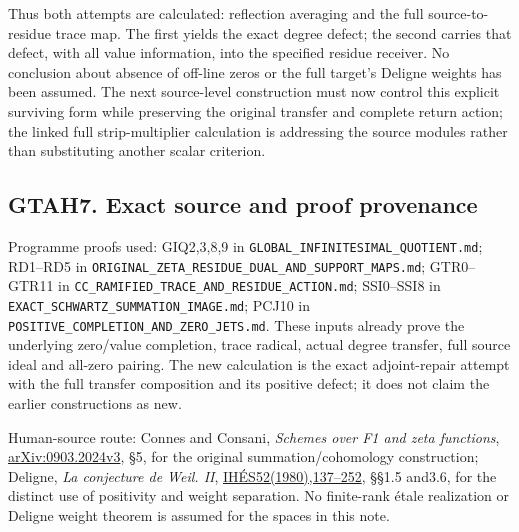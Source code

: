 Thus both attempts are calculated: reflection averaging and the full
source-to-residue trace map. The first yields the exact degree defect;
the second carries that defect, with all value information, into the
specified residue receiver. No conclusion about absence of off-line
zeros or the full target's Deligne weights has been assumed. The next
source-level construction must now control this explicit surviving form
while preserving the original transfer and complete return action; the
linked full strip-multiplier calculation is addressing the source
modules rather than substituting another scalar criterion.

\subsection{GTAH7. Exact source and proof
provenance}\label{gtah7.-exact-source-and-proof-provenance}

Programme proofs used: GIQ2,3,8,9 in
\nolinkurl{GLOBAL_INFINITESIMAL_QUOTIENT.md}; RD1--RD5 in
\nolinkurl{ORIGINAL_ZETA_RESIDUE_DUAL_AND_SUPPORT_MAPS.md}; GTR0--GTR11
in \nolinkurl{CC_RAMIFIED_TRACE_AND_RESIDUE_ACTION.md}; SSI0--SSI8 in
\nolinkurl{EXACT_SCHWARTZ_SUMMATION_IMAGE.md}; PCJ10 in
\nolinkurl{POSITIVE_COMPLETION_AND_ZERO_JETS.md}. These inputs already
prove the underlying zero/value completion, trace radical, actual degree
transfer, full source ideal and all-zero pairing. The new calculation is
the exact adjoint-repair attempt with the full transfer composition and
its positive defect; it does not claim the earlier constructions as new.

Human-source route: Connes and Consani, \emph{Schemes over F1 and zeta
functions}, \href{https://arxiv.org/abs/0903.2024}{arXiv:0903.2024v3},
§5, for the original summation/cohomology construction; Deligne,
\emph{La conjecture de Weil. II},
\href{https://www.numdam.org/item/PMIHES_1980__52__137_0/}{IHÉS52(1980),137--252},
§§1.5 and3.6, for the distinct use of positivity and weight separation.
No finite-rank étale realization or Deligne weight theorem is assumed
for the spaces in this note.
